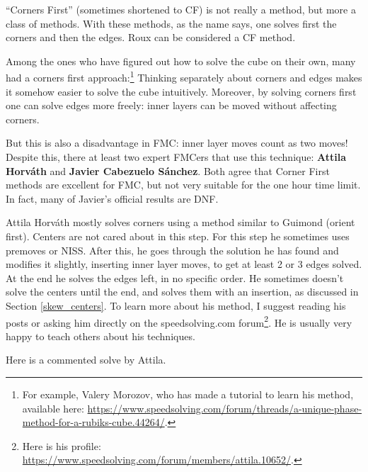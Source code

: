 \documentclass[11pt,a4paper]{book}
\begin{document}
``Corners First'' (sometimes shortened to CF) is not really a method, but more a class of methods. With these methods, as the name says, one solves first the corners and then the edges. Roux can
 be considered a CF method.

Among the ones who have figured out how to solve the cube on their own, many had a corners first approach:\footnote{For example, Valery Morozov, who has made a tutorial to learn his method, available here: \url{https://www.speedsolving.com/forum/threads/a-unique-phase-method-for-a-rubiks-cube.44264/}.} Thinking separately about corners and edges makes it somehow easier to solve the cube intuitively. Moreover, by solving corners first one can solve edges more freely: inner layers can be moved without affecting corners.

But this is also a disadvantage in FMC: inner layer moves count as two moves! Despite this, there at least two expert FMCers that use this technique: \textbf{Attila Horváth} and \textbf{Javier Cabezuelo Sánchez}. Both agree that Corner First methods are excellent for FMC, but not very suitable for the one hour time limit. In fact, many of Javier's official results are DNF.

Attila Horváth mostly solves corners using a method similar to Guimond (orient first). Centers are not cared about in this step. For this step he sometimes uses premoves or NISS. After this, he goes through the solution he has found and modifies it slightly, inserting inner layer moves, to get at least 2 or 3 edges solved. At the end he solves the edges left, in no specific order. He sometimes doesn't solve the centers until the end, and solves them with an insertion, as discussed in Section \ref{skew_centers}. To learn more about his method, I suggest reading his posts or asking him directly on the speedsolving.com forum\footnote{Here is his profile: \url{https://www.speedsolving.com/forum/members/attila.10652/}.}. He is usually very happy to teach others about his techniques. 

Here is a commented solve by Attila.
\end{document}
